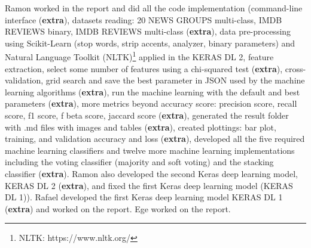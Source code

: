 \documentclass[conference]{IEEEtran}
\begin{document}
Ramon worked in the report and did all the code implementation (command-line interface (\textbf{extra}), datasets reading: 20 NEWS GROUPS multi-class, IMDB REVIEWS binary, IMDB REVIEWS multi-class (\textbf{extra}), data pre-processing using Scikit-Learn (stop words, strip accents, analyzer, binary parameters) and Natural Language Toolkit (NLTK)\footnote{NLTK: https://www.nltk.org/} applied in the KERAS DL 2, feature extraction, select some number of features using a chi-squared test (\textbf{extra}), cross-validation, grid search and save the best parameter in JSON used by the machine learning algorithms (\textbf{extra}), run the machine learning with the default and best parameters (\textbf{extra}), more metrics beyond accuracy score: precision score, recall score, f1 score, f beta score, jaccard score (\textbf{extra}), generated the result folder with .md files with images and tables (\textbf{extra}), created plottings: bar plot, training, and validation accuracy and loss (\textbf{extra}), developed all the five required machine learning classifiers and twelve more machine learning implementations including the voting classifier (majority and soft voting) and the stacking classifier (\textbf{extra}). Ramon also developed the second Keras deep learning model, KERAS DL 2 (\textbf{extra}), and fixed the first Keras deep learning model (KERAS DL 1)). Rafael developed the first Keras deep learning model KERAS DL 1 (\textbf{extra}) and worked on the report. Ege worked on the report.

\medskip

\small





\end{document}

